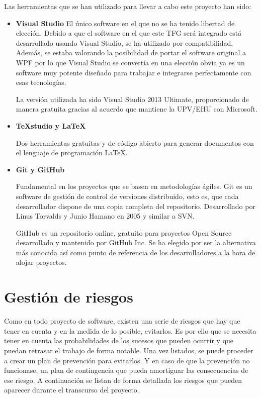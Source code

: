 Las herramientas que se han utilizado para llevar a cabo este proyecto han sido:
\begin{itemize}
    \item 
    \textbf{Visual Studio}
    El \'unico software en el que no se ha tenido libertad de elecci\'on. Debido a que el 
    software en el que este TFG
    ser\'a integrado est\'a desarrollado usando Visual Studio, se ha utilizado por 
    compatibilidad. Adem\'as, se estaba
    valorando la posibilidad de portar el software original a WPF por lo que Visual Studio se 
    convert\'ia en una elecci\'on
    obvia ya es un software muy potente dise\~nado para trabajar e integrarse perfectamente con 
    esas tecnolog\'ias.

    La versi\'on utilizada ha sido Visual Studio 2013 Ultimate, proporcionado de manera gratuita 
    gracias al acuerdo que mantiene 
    la UPV/EHU con Microsoft.
    
    \item 
    \textbf{TeXstudio y \LaTeX}
    
    Dos herramientas gratuitas y de código abierto para generar documentos con el lenguaje de 
    programaci\'on \LaTeX.
    
    \item
    \textbf{Git y GitHub}
    
    Fundamental en los proyectos que se basen en metodologías ágiles. Git es un software de 
    gestión de control de versiones 
    distribuido, esto es, que cada desarrollador dispone de una copia completa del repositorio. 
    Desarrollado por Linus Torvalds y 
    Junio Hamano en 2005 y similar a SVN.
    
    GitHub es un repositorio online, gratuito para proyectos Open Source desarrollado y mantenido 
    por GitHub Inc. Se ha elegido
    por ser la alternativa m\'as conocida as\'i como punto de referencia de los desarrolladores a 
    la hora de alojar proyectos.
    
\end{itemize}

\section{Gesti\'{o}n de riesgos}
Como en todo proyecto de software, existen una serie de riesgos que hay que tener en cuenta y en 
la medida de lo posible,
evitarlos. Es por ello que se necesita tener en cuenta las probabilidades de los sucesos que 
pueden ocurrir y que puedan retrasar el trabajo de forma notable. Una vez
listados, se puede proceder a crear un plan de prevención para evitarlos. Y en caso de que la 
prevenci\'on no
funcionase, un plan de contingencia que pueda amortiguar las consecuencias de ese riesgo. A 
continuación
se listan de forma detallada los riesgos que pueden aparecer durante el transcurso del proyecto.


